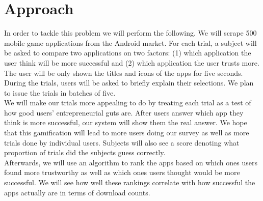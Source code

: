 \section{Approach}

In order to tackle this problem we will perform the following. We will scrape 500 mobile game applications from the Android market. For each trial, a subject will be asked to compare two applications on two factors: (1) which application the user think will be more successful and (2) which application the user trusts more. The user will be only shown the titles and icons of the apps for five seconds. During the trials, users will be asked to briefly explain their selections. We plan to issue the trials in batches of five. \\

We will make our trials more appealing to do by treating each trial as a test of how good users' entrepreneurial guts are. After users answer which app they think is more successful, our system will show them the real answer. We hope that this gamification will lead to more users doing our survey as well as more trials done by individual users. Subjects will also see a score denoting what proportion of trials did the subjects guess correctly. \\

Afterwards, we will use an algorithm to rank the apps based on which ones users found more trustworthy as well as which ones users thought would be more successful. We will see how well these rankings correlate with how successful the apps actually are in terms of download counts.

